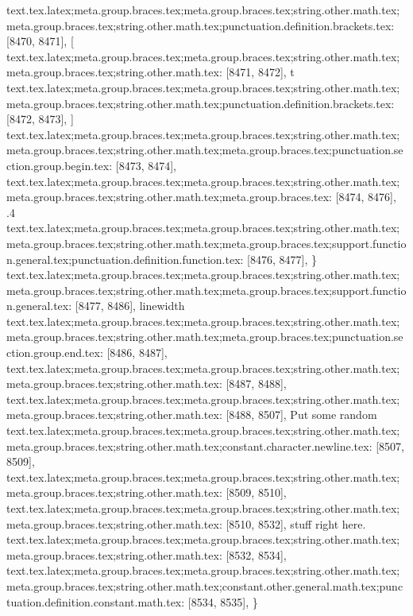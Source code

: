 {{{{{{{{{{{{{{{{{{{{{{{{{{{{{{{{{{{{{{{{{{{{{{{{{{{{{{{{{{{{{{{{{{{{{{{{{{{{{{{{{{{{{{{{{{{{{{{{{{{{{{{{{{{{{{{{{{{{{{{{{{{{{{{{{{{{{{{{{{{{{{{{{{{{{{{{{{{{{{{{{{{{{{{{{{{{{{{{{{{{{{{{{{{{{{{{{{{{{{{{{{{{{{{{{{{{{{{{{{{{{{{{{{{{{{{{{{{{{{{{{{{{{{{text.tex.latex;meta.group.braces.tex;meta.group.braces.tex;string.other.math.tex;meta.group.braces.tex;string.other.math.tex;punctuation.definition.brackets.tex: [8470, 8471], {[}
text.tex.latex;meta.group.braces.tex;meta.group.braces.tex;string.other.math.tex;meta.group.braces.tex;string.other.math.tex: [8471, 8472], {t}
text.tex.latex;meta.group.braces.tex;meta.group.braces.tex;string.other.math.tex;meta.group.braces.tex;string.other.math.tex;punctuation.definition.brackets.tex: [8472, 8473], {]}
text.tex.latex;meta.group.braces.tex;meta.group.braces.tex;string.other.math.tex;meta.group.braces.tex;string.other.math.tex;meta.group.braces.tex;punctuation.section.group.begin.tex: [8473, 8474], {{}
text.tex.latex;meta.group.braces.tex;meta.group.braces.tex;string.other.math.tex;meta.group.braces.tex;string.other.math.tex;meta.group.braces.tex: [8474, 8476], {.4}
text.tex.latex;meta.group.braces.tex;meta.group.braces.tex;string.other.math.tex;meta.group.braces.tex;string.other.math.tex;meta.group.braces.tex;support.function.general.tex;punctuation.definition.function.tex: [8476, 8477], {\}
text.tex.latex;meta.group.braces.tex;meta.group.braces.tex;string.other.math.tex;meta.group.braces.tex;string.other.math.tex;meta.group.braces.tex;support.function.general.tex: [8477, 8486], {linewidth}
text.tex.latex;meta.group.braces.tex;meta.group.braces.tex;string.other.math.tex;meta.group.braces.tex;string.other.math.tex;meta.group.braces.tex;punctuation.section.group.end.tex: [8486, 8487], {}}
text.tex.latex;meta.group.braces.tex;meta.group.braces.tex;string.other.math.tex;meta.group.braces.tex;string.other.math.tex: [8487, 8488], {
}
text.tex.latex;meta.group.braces.tex;meta.group.braces.tex;string.other.math.tex;meta.group.braces.tex;string.other.math.tex: [8488, 8507], {    Put some random}
text.tex.latex;meta.group.braces.tex;meta.group.braces.tex;string.other.math.tex;meta.group.braces.tex;string.other.math.tex;constant.character.newline.tex: [8507, 8509], {\\}
text.tex.latex;meta.group.braces.tex;meta.group.braces.tex;string.other.math.tex;meta.group.braces.tex;string.other.math.tex: [8509, 8510], {
}
text.tex.latex;meta.group.braces.tex;meta.group.braces.tex;string.other.math.tex;meta.group.braces.tex;string.other.math.tex: [8510, 8532], {    stuff right here.
}
text.tex.latex;meta.group.braces.tex;meta.group.braces.tex;string.other.math.tex;meta.group.braces.tex;string.other.math.tex: [8532, 8534], {  }
text.tex.latex;meta.group.braces.tex;meta.group.braces.tex;string.other.math.tex;meta.group.braces.tex;string.other.math.tex;constant.other.general.math.tex;punctuation.definition.constant.math.tex: [8534, 8535], {\}
}}}}}}}}}}}}}}}}}}}}}}}}}}}}}}}}}}}}}}}}}}}}}}}}}}}}}}}}}}}}}}}}}}}}}}}}}}}}}}}}}}}}}}}}}}}}}}}}}}}}}}}}}}}}}}}}}}}}}}}}}}}}}}}}}}}}}}}}}}}}}}}}}}}}}}}}}}}}}}}}}}}}}}}}}}}}}}}}}}}}}}}}}}}}}}}}}}}}}}}}}}}}}}}}}}}}}}}}}}}}}}}}}}}}}}}}}}}}}}}}}}}}}}}}}
